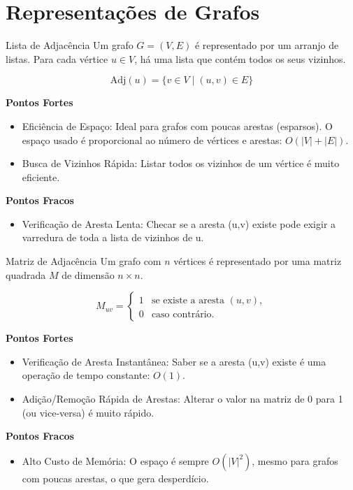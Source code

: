 \section{Representações de Grafos}

\begin{frame}{Lista de Adjacência}
    Um grafo $G=(V,E)$ é representado por um arranjo de listas. Para cada vértice $u \in V$, há uma lista que contém todos os seus vizinhos.
    
    $$ \text{Adj}(u) = \{ v \in V \mid (u, v) \in E \} $$
    
    \pause %
    
    \textbf{Pontos Fortes}
    \begin{itemize}
        \item<+-> Eficiência de Espaço: Ideal para grafos com poucas arestas (esparsos). O espaço usado é proporcional ao número de vértices e arestas: $O(|V|+|E|)$.
        \item<+-> Busca de Vizinhos Rápida: Listar todos os vizinhos de um vértice é muito eficiente.
    \end{itemize}

    \pause %
    
    \textbf{Pontos Fracos}
    \begin{itemize}
        \item<+-> Verificação de Aresta Lenta: Checar se a aresta (u,v) existe pode exigir a varredura de toda a lista de vizinhos de u.
    \end{itemize}
\end{frame}

\begin{frame}{Matriz de Adjacência}
    Um grafo com $n$ vértices é representado por uma matriz quadrada $M$ de dimensão $n \times n$.
    
    $$
    M_{uv} =
    \begin{cases}
        1 & \text{se existe a aresta } (u, v), \\
        0 & \text{caso contrário.}
    \end{cases}
    $$
    
    \pause %
    
    \textbf{Pontos Fortes}
    \begin{itemize}
        \item<+-> Verificação de Aresta Instantânea: Saber se a aresta (u,v) existe é uma operação de tempo constante: $O(1)$.
        \item<+-> Adição/Remoção Rápida de Arestas: Alterar o valor na matriz de 0 para 1 (ou vice-versa) é muito rápido.
    \end{itemize}    

    \pause %
    
    \textbf{Pontos Fracos}
    \begin{itemize}
        \item<+-> Alto Custo de Memória: O espaço é sempre $O(|V|^2)$, mesmo para grafos com poucas arestas, o que gera desperdício.
    \end{itemize}
\end{frame}


